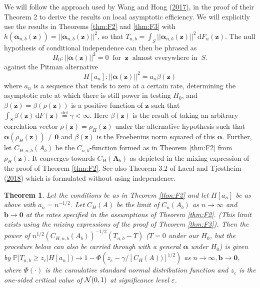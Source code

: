 \documentclass[
  12pt,
  letterpaper]{article}
\newtheorem{thm}{Theorem}[section]
\numberwithin{equation}{section}
\newcommand{\z}{\bm{z}}
\newcommand{\fA}{\bm{A}}
\newcommand{\bb}{\bm{b}}
\newcommand{\falpha}{\bm{\alpha}}
\newcommand{\di}{\,\textrm{d}}
\begin{document}
We will follow the approach used by Wang and Hong (\protect\hyperlink{ref-wang2017characteristic}{2017}), in the proof of their Theorem 2 to derive the results on local asymptotic efficiency. We will explicitly use the results in Theorems \ref{thm:F2} and \ref{thm:F3} with \(h({\falpha}_{n,b}(\z)) = ||{\falpha}_{n,b}(\z)||^2\), so that \(T_{n,b} = \int _S||{\falpha}_{n,b}(\z)||^2 \di F_n(\z)\). The null hypothesis of conditional independence can then be phrased as
\[
H_0: ||{\falpha(\z)}||^2 =  0 \;\; \mbox{for} \;\;\z \;\; \mbox{almost everywhere in} \;\;S. 
\]
against the Pitman alternative
\[
H[a_n]: ||{\falpha(\z)}||^2 = a_n\beta(\z)
\]
where \(a_n\) is a sequence that tends to zero at a certain rate, determining the asymptotic rate at which there is still power in testing \(H_0\), and \(\beta (\z) =\beta(\rho(\z))\) is a positive function of \(\z\) such that \(\int_S \beta(\z) \di F(\z) \stackrel{\textrm{def}}{=} \gamma < \infty\). Here \(\beta(\z)\) is the result of taking an arbitrary correlation vector \(\rho(\z) = \rho_H(\z)\) under the alternative hypothesis such that \({\falpha}(\rho_H(\z)) \neq {\bm{0}}\) and \(\beta(\z)\) is the Froebenius norm squared of this \({\falpha}\). Further, let \(C_{H,n,b}(A_b)\) be the \(C_{n,b}\)-function formed as in Theorem \ref{thm:F2} from \(\rho_H(\z)\). It converges towards \(C_{H}(\fA_b)\) as depicted in the mixing expression of the proof of Theorem \ref{thm:F2}. See also Theorem 3.2 of Lacal and Tjøstheim (\protect\hyperlink{ref-lacal2018estimating}{2018}) which is formulated without using independence.

\begin{thm}
Let the conditions be as in Theorem \ref{thm:F2} and let $H[a_n]$ be as above with $a_n =n^{-1/2}$. Let $C_H(A)$ be the limit of $C_n(A_b)$ as $n \to \infty$ and $\bb \to \bm{0}$ at the rates specified in the assumptions of Theorem \ref{thm:F2}. (This limit exists using the mixing expressions of the proof of Theorem \ref{thm:F3}). Then the power of $n^{1/2}(C_{H,n,b}(A_b))^{-1/2}(T_{n,b}-T)$ ($T = 0$ under our $H_0$, but the procedure below can also be carried through with a general ${\falpha}$ under $H_0$) is given by $\mathbb{P}[T_{n,b} \geq z_{\varepsilon}|H[a_n]) \to 1-\Phi(z_{\varepsilon}-\gamma/[C_{H}(A))]^{1/2})$ as $n \to \infty, \bb \to \bm{0}$, where $\Phi(\cdot)$ is the cumulative standard normal distribution function and $z_{\varepsilon}$ is the one-sided critical value of ${\cal N}(0,1)$ at significance level $\varepsilon$.
\label{thm:G1}
\end{thm}
\end{document}

